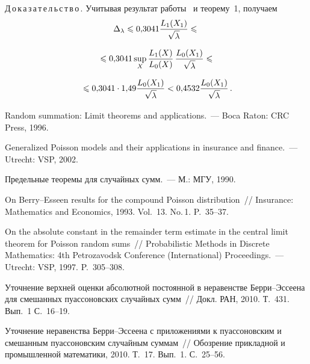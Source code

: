 \begin{multicols}{2}
\bigskip
\bigskip

\noindent
Д\,о\,к\,а\,з\,а\,т\,е\,л\,ь\,с\,т\,в\,о\,.
Учитывая результат работы~\cite{KorolevShevtsova2010SAJ} и
теорему~1, получаем
\begin{multline*}
\Delta_\lambda\leqslant 0{,}3041 \displaystyle\frac{\displaystyle L_1(X_1)\mathstrut}{\displaystyle \sqrt{\lambda}\mathstrut}\leqslant{}\\[6pt]
{}\leqslant
0{,}3041
\sup\limits_X\displaystyle\frac{\displaystyle L_1(X)\mathstrut}{\displaystyle L_0(X)\mathstrut}\,\displaystyle\frac{\displaystyle L_0(X_1)\mathstrut}{\displaystyle \sqrt{\lambda}\mathstrut}\leqslant{}\\[6pt]
{}\leqslant
 0{,}3041 \cdot 1{,}49\displaystyle\frac{\displaystyle L_0(X_1)\mathstrut}{\displaystyle \sqrt{\lambda}\mathstrut} <
0{,}4532\displaystyle\frac{\displaystyle L_0(X_1)\mathstrut}{\displaystyle \sqrt{\lambda}\mathstrut}\,.
\end{multline*}



{\small\frenchspacing
{%
\begin{thebibliography}{99}

 Random summation: Limit theorems
and applications.~--- Boca Raton: CRC Press, 1996.


 Generalized Poisson models and their
applications in insurance and finance.~--- Utrecht: VSP, 2002.

 Предельные теоремы для
случайных сумм.~--- М.: МГУ, 1990.

 On Berry--Esseen results for the compound Poisson
distribution~// Insurance: Mathematics and Economics, 1993. Vol.~13.
No.\,1. P.~35--37.

 On the absolute constant in the
remainder term estimate in the central limit theorem for Poisson
random sums~// Probabilistic Methods in Discrete Mathematics:
4th  Petrozavodsk Conference (International) Proceedings.~---
Utrecht: VSP, 1997. P.~305--308.


 Уточнение верхней оценки
абсолютной постоянной в неравенстве Бер\-ри--Эссеена для смешанных
пуассоновских случайных сумм~// Докл. РАН, 2010. Т.~431. Вып.~1 С.~16--19.

 Уточнение неравенства
Бер\-ри--Эссеена с приложениями к пуассоновским и смешанным
пуассоновским случайным суммам~// Обозрение прикладной и
промышленной математики, 2010. Т.~17. Вып.~1. С.~25--56.


\end{thebibliography}}}
\end{multicols}
